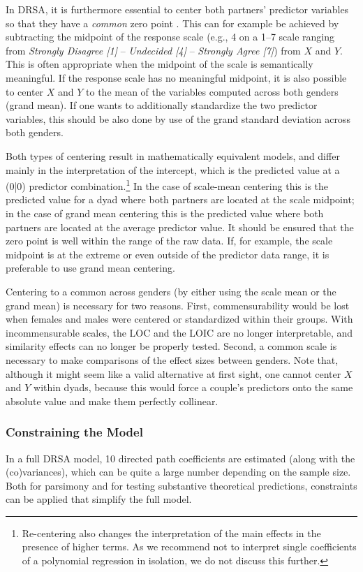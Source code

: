 \documentclass[jou,a4paper,draftfirst]{apa6}
\newcommand{\added}[1]{#1}
\begin{document}
In DRSA, it is furthermore essential to center both partners' predictor variables so that they have a \textit{common} zero point \parencite{kenny_partner_1999,kenny_dyadic_2006}. This can for example be achieved by subtracting the midpoint of the response scale (e.g., 4 on a 1--7 scale ranging from \textit{Strongly Disagree [1]} -- \textit{Undecided [4]} -- \textit{Strongly Agree [7]}) from $X$ and $Y$. This is often appropriate when the midpoint of the scale is semantically meaningful. If the response scale has no meaningful midpoint, it is also possible to center $X$ and $Y$ to the mean of the variables computed across both genders (grand mean). If one wants to additionally standardize the two predictor variables, this should be also done by use of the grand standard deviation across both genders. 

\added{Both types of centering result in mathematically equivalent models, and differ mainly in the interpretation of the intercept, which is the predicted value at a (0|0) predictor combination.\footnote{\added{Re-centering also changes the interpretation of the main effects in the presence of higher terms. As we recommend not to interpret single coefficients of a polynomial regression in isolation, we do not discuss this further.}} In the case of scale-mean centering this is the predicted value for a dyad where both partners are located at the scale midpoint; in the case of grand mean centering this is the predicted value where both partners are located at the average predictor value. It should be ensured that the zero point is well within the range of the raw data. If, for example, the scale midpoint is at the extreme or even outside of the predictor data range, it is preferable to use grand mean centering.}

Centering to a common across genders (by either using the scale mean or the grand mean) is necessary for two reasons. First, commensurability would be lost when females and males were centered or standardized within their groups. With incommensurable scales, the LOC and the LOIC are no longer interpretable, \added{and similarity effects can no longer be properly tested}. Second, a common scale is necessary to make comparisons of the effect sizes between genders. Note that, although it might seem like a valid alternative at first sight, one cannot center $X$ and $Y$ within dyads, because this would force a couple’s predictors onto the same absolute value and make them perfectly collinear.

\subsubsection{Constraining the Model}
In a full DRSA model, 10 directed path coefficients are estimated (along with the (co)variances), which can be quite a large number depending on the sample size. Both for parsimony and for testing substantive theoretical predictions, constraints can be applied that simplify the full model.
\end{document}
